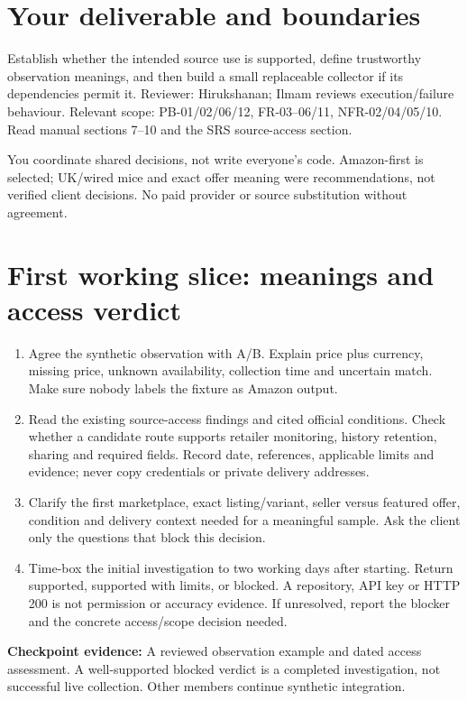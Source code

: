 
\sharedintro
\section*{Your deliverable and boundaries}
Establish whether the intended source use is supported, define trustworthy observation meanings, and then build a small replaceable collector if its dependencies permit it. Reviewer: Hirukshanan; Ilmam reviews execution/failure behaviour. Relevant scope: PB-01/02/06/12, FR-03--06/11, NFR-02/04/05/10. Read manual sections 7--10 and the SRS source-access section.

You coordinate shared decisions, not write everyone's code. Amazon-first is selected; UK/wired mice and exact offer meaning were recommendations, not verified client decisions. No paid provider or source substitution without agreement.
\section*{First working slice: meanings and access verdict}
\begin{enumerate}
\item Agree the synthetic observation with A/B. Explain price plus currency, missing price, unknown availability, collection time and uncertain match. Make sure nobody labels the fixture as Amazon output.
\item Read the existing source-access findings and cited official conditions. Check whether a candidate route supports retailer monitoring, history retention, sharing and required fields. Record date, references, applicable limits and evidence; never copy credentials or private delivery addresses.
\item Clarify the first marketplace, exact listing/variant, seller versus featured offer, condition and delivery context needed for a meaningful sample. Ask the client only the questions that block this decision.
\item Time-box the initial investigation to two working days after starting. Return supported, supported with limits, or blocked. A repository, API key or HTTP 200 is not permission or accuracy evidence. If unresolved, report the blocker and the concrete access/scope decision needed.
\end{enumerate}
\textbf{Checkpoint evidence:} A reviewed observation example and dated access assessment. A well-supported blocked verdict is a completed investigation, not successful live collection. Other members continue synthetic integration.
\newpage
